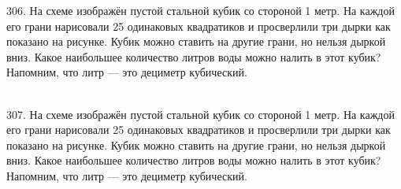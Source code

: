 \documentclass[12pt]{article}
\begin{document}
306. На схеме изображён пустой стальной кубик со стороной 1 метр. На каждой его грани нарисовали 25 одинаковых квадратиков и просверлили три дырки как показано на рисунке. Кубик можно ставить на другие грани, но нельзя дыркой вниз. Какое наибольшее количество литров воды можно налить в этот кубик? Напомним, что литр --- это дециметр кубический.
\begin{figure}[ht!]
\end{figure}\\
307. На схеме изображён пустой стальной кубик со стороной 1 метр. На каждой его грани нарисовали 25 одинаковых квадратиков и просверлили три дырки как показано на рисунке. Кубик можно ставить на другие грани, но нельзя дыркой вниз. Какое наибольшее количество литров воды можно налить в этот кубик? Напомним, что литр --- это дециметр кубический.
\begin{figure}[ht!]
\end{figure}\\
\end{document}

